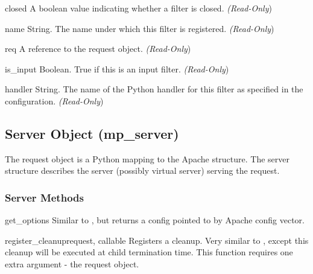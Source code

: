 \begin{memberdesc}[filter]{closed}
  A boolean value indicating whether a filter is closed.
  \emph{(Read-Only})
\end{memberdesc}

\begin{memberdesc}[filter]{name}
  String. The name under which this filter is registered.
  \emph{(Read-Only})
\end{memberdesc}

\begin{memberdesc}[filter]{req}
  A reference to the request object.
  \emph{(Read-Only})
\end{memberdesc}

\begin{memberdesc}[filter]{is_input}
  Boolean. True if this is an input filter.
  \emph{(Read-Only})
\end{memberdesc}

\begin{memberdesc}[filter]{handler}
  String. The name of the Python handler for this filter as specified in
  the configuration. 
  \emph{(Read-Only})
\end{memberdesc}

\subsection{Server Object (mp_server)\label{pyapi-mpserver}}

The request object is a Python mapping to the Apache 
structure. The server structure describes the server (possibly virtual
server) serving the request.

\subsubsection{Server Methods\label{pyapi-mpsrv-meth}}

\begin{methoddesc}[server]{get_options}{}
  Similar to , but returns a config pointed to
  by  Apache config vector. 
\end{methoddesc}

\begin{methoddesc}[server]{register_cleanup}{request, callable}
  Registers a cleanup. Very similar to , except
  this cleanup will be executed at child termination time. This function
  requires one extra argument - the request object.
\end{methoddesc}

